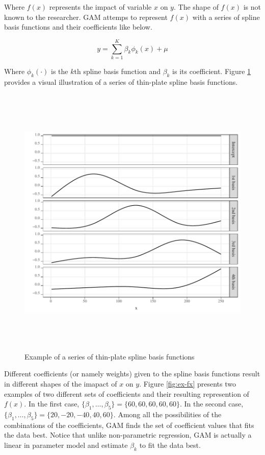 \documentclass[
]{article}
\begin{document}
Where \(f(x)\) represents the impact of variable \(x\) on \(y\). The shape of \(f(x)\) is not known to the researcher. GAM attemps to represent \(f(x)\) with a series of spline basis functions and their coefficients like below.

\begin{equation}
y = \sum_{k=1}^K \beta_k \phi_k(x) + \mu
\end{equation}

Where \(\phi_k(\cdot)\) is the \(k\)th spline basis function and \(\beta_k\) is its coefficient. Figure \ref{fig:sp-basis} provides a visual illustration of a series of thin-plate spline basis functions.

\begin{figure}[H]

{\centering \includegraphics[width=6in,height=500px,]{Figures/g_basis} 

}

\caption{Example of a series of thin-plate spline basis functions}\label{fig:sp-basis}
\end{figure}

Different coefficients (or namely weights) given to the spline basis functions result in different shapes of the imapact of \(x\) on \(y\). Figure \ref{fig:ex-fx} presents two examples of two different sets of coefficients and their resulting represention of \(f(x)\). In the first case, \(\{\beta_1, \dots, \beta_5\} = \{60, 60, 60, 60, 60\}\). In the second case, \(\{\beta_1, \dots, \beta_5\} = \{20, -20, -40, 40, 60\}\). Among all the possibilities of the combinations of the coefficients, GAM finds the set of coefficient values that fits the data best. Notice that unlike non-parametric regression, GAM is actually a linear in parameter model and estimate \(\beta_k\) to fit the data best.
\end{document}
